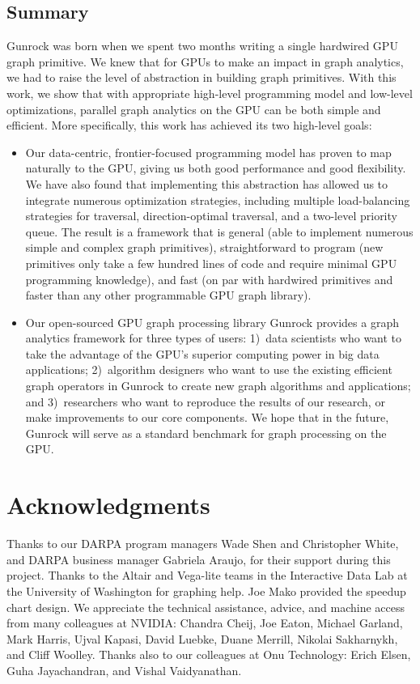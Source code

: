\documentclass[format=acmsmall,review=false,screen=true]{acmart}
\begin{document}
\subsection{Summary}
Gunrock was born when we spent two months writing a single hardwired
GPU graph primitive. We knew that for GPUs to make an impact in graph
analytics, we had to raise the level of abstraction in building graph
primitives. With this work, we show that with appropriate high-level
programming model and low-level optimizations, parallel graph
analytics on the GPU can be both simple and efficient. More
specifically, this work has achieved its two high-level goals:
\begin{itemize}
\item Our data-centric, frontier-focused programming model has proven
  to map naturally to the GPU, giving us both good performance and
  good flexibility. We have also found that implementing this
  abstraction has allowed us to integrate numerous optimization
  strategies, including multiple load-balancing strategies for
  traversal, direction-optimal traversal, and a two-level priority
  queue. The result is a framework that is general (able to implement
  numerous simple and complex graph primitives), straightforward to
  program (new primitives only take a few hundred lines of code and
  require minimal GPU programming knowledge), and fast (on par with
  hardwired primitives and faster than any other programmable GPU
  graph library).
\item Our open-sourced GPU graph processing library Gunrock provides a
  graph analytics framework for three types of users: 1)~data
  scientists who want to take the advantage of the GPU's superior
  computing power in big data applications; 2)~algorithm designers who
  want to use the existing efficient graph operators in Gunrock to
  create new graph algorithms and applications; and 3)~researchers who
  want to reproduce the results of our research, or make improvements
  to our core components. We hope that in the future, Gunrock will
  serve as a standard benchmark for graph processing on the GPU\@.
\end{itemize}

\section*{Acknowledgments}
\label{sec:acks}
Thanks to our DARPA program managers Wade Shen and Christopher White,
and DARPA business manager Gabriela Araujo, for their support during
this project. Thanks to the Altair and Vega-lite teams in the
Interactive Data Lab at the University of Washington for graphing
help. Joe Mako provided the speedup chart design. We appreciate the
technical assistance, advice, and machine access from many colleagues
at NVIDIA\@: Chandra Cheij, Joe Eaton, Michael Garland, Mark Harris,
Ujval Kapasi, David Luebke, Duane Merrill, Nikolai Sakharnykh, and
Cliff Woolley. Thanks also to our colleagues at Onu Technology: Erich
Elsen, Guha Jayachandran, and Vishal Vaidyanathan.
\end{document}
